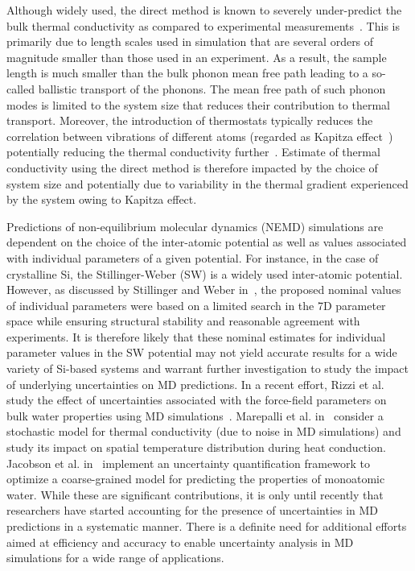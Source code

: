 Although widely used, the direct method is known to severely under-predict
the bulk thermal conductivity as compared to experimental 
measurements~\cite{Haynes:2014,Shanks:1963}. This is primarily
due to length scales used in simulation that are several orders of magnitude smaller
than those used in an experiment. As a result, the sample length is much smaller than the
bulk phonon mean free path leading to a so-called ballistic transport of the phonons.
The mean free path of such phonon modes is limited to the system size that reduces their
contribution to thermal transport. Moreover, the
introduction of thermostats typically reduces the correlation between vibrations of 
different atoms (regarded as Kapitza effect~\cite{Stevens:2007}) potentially reducing
the thermal conductivity
further~\cite{Evans:2008}. Estimate of thermal conductivity using the
direct method is therefore impacted by the choice of system size and potentially due to
variability in the thermal gradient experienced by the system owing to
Kapitza effect.  

Predictions of non-equilibrium molecular dynamics (NEMD) simulations are dependent on the
choice of the inter-atomic potential as well as values associated with individual parameters
of a given potential. For instance, in the case of crystalline Si, the Stillinger-Weber (SW)
is a widely used inter-atomic potential. However, as discussed by Stillinger and Weber
in~\cite{Stillinger:1985}, the proposed nominal values of individual parameters were based
on a limited search in the 7D parameter space while ensuring structural stability and
reasonable agreement with experiments. It is therefore likely that these nominal estimates
for individual parameter values in the SW potential may not yield accurate results for a
wide variety of Si-based systems and warrant further investigation to study the impact of
underlying uncertainties on MD predictions. 
In a recent effort, Rizzi et al. study the effect of
uncertainties associated with the force-field parameters on bulk water properties using MD
simulations~\cite{Rizzi:2012}. Marepalli et al. in~\cite{Marepalli:2014} consider a stochastic model
for thermal conductivity (due to noise in MD simulations) and study its impact on spatial temperature 
distribution during heat conduction. Jacobson et al. in~\cite{Jacobson:2014} implement an uncertainty
quantification framework to optimize a coarse-grained model for predicting the properties of monoatomic
 water. While these are significant contributions, it is only until recently 
that researchers have started accounting for the presence of uncertainties in MD predictions in a
systematic manner. There is a definite need for additional efforts aimed at efficiency and accuracy
to enable uncertainty analysis in MD simulations for a wide range of applications.

